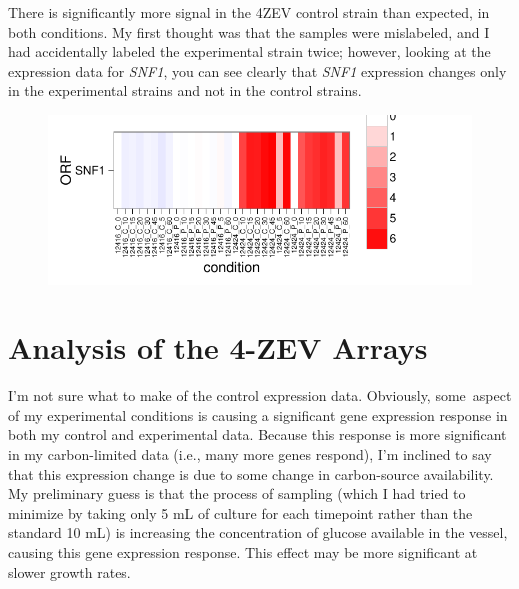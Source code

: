 \documentclass[letter]{article}\usepackage{graphicx, color}
\makeatletter
\def\maxwidth{ %
  \ifdim\Gin@nat@width>\linewidth
    \linewidth
  \else
    \Gin@nat@width
  \fi
}
\newenvironment{knitrout}{}{} %
\makeatother
\begin{document}
There is significantly more signal in the 4ZEV control strain than expected, in both conditions. My first thought was that the samples were mislabeled, and I had accidentally labeled the experimental strain twice; however, looking at the expression data for \emph{SNF1}, you can see clearly that \emph{SNF1} expression changes only in the experimental strains and not in the control strains.
\begin{figure}[H]
\centering
\begin{knitrout}
\color{fgcolor}\includegraphics[width=\maxwidth]{figure/p3} 
\end{knitrout}

\end{figure}

\section*{Analysis of the 4-ZEV Arrays}

I'm not sure what to make of the control expression data. Obviously, some aspect of my experimental conditions is causing a significant gene expression response in both my control and experimental data. Because this response is more significant in my carbon-limited data (i.e., many more genes respond), I'm inclined to say that this expression change is due to some change in carbon-source availability. My preliminary guess is that the process of sampling (which I had tried to minimize by taking only 5 mL of culture for each timepoint rather than the standard 10 mL) is increasing the concentration of glucose available in the vessel, causing this gene expression response. This effect may be more significant at slower growth rates.
\end{document}
